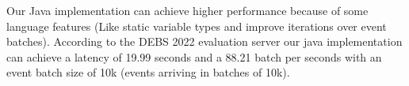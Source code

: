 
Our Java implementation can achieve higher performance because of some language features (Like static variable types and improve iterations over event batches). 
According to the DEBS 2022 evaluation \cite{debs2022challenge} server our java implementation can achieve a latency of 19.99 seconds and a 88.21 batch per 
seconds with an event batch size of 10k (events arriving in batches of 10k).
